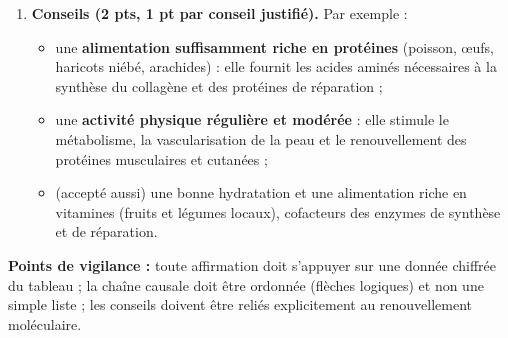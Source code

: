 \documentclass[11pt]{article}
\begin{document}
\begin{corrige}
\begin{enumerate}
\item \textbf{Conseils (2 pts, 1 pt par conseil justifié).} Par exemple :
\begin{itemize}
\item une \textbf{alimentation suffisamment riche en protéines} (poisson, œufs, haricots niébé, arachides) : elle fournit les acides aminés nécessaires à la synthèse du collagène et des protéines de réparation ;
\item une \textbf{activité physique régulière et modérée} : elle stimule le métabolisme, la vascularisation de la peau et le renouvellement des protéines musculaires et cutanées ;
\item (accepté aussi) une bonne hydratation et une alimentation riche en vitamines (fruits et légumes locaux), cofacteurs des enzymes de synthèse et de réparation.
\end{itemize}
\end{enumerate}
\textbf{Points de vigilance :} toute affirmation doit s'appuyer sur une donnée chiffrée du tableau ; la chaîne causale doit être ordonnée (flèches logiques) et non une simple liste ; les conseils doivent être reliés explicitement au renouvellement moléculaire.
\end{corrige}
\end{document}
